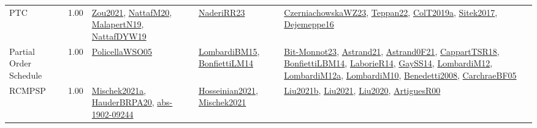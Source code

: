 {\begin{longtable}{p{3cm}r>{\raggedright\arraybackslash}p{6cm}>{\raggedright\arraybackslash}p{6cm}>{\raggedright\arraybackslash}p{8cm}}
\index{PTC}\index{Classification!PTC}PTC &  1.00 & \hyperref[detail:Zou2021]{Zou2021}, \hyperref[detail:NattafM20]{NattafM20}, \hyperref[detail:MalapertN19]{MalapertN19}, \hyperref[detail:NattafDYW19]{NattafDYW19} & \hyperref[detail:NaderiRR23]{NaderiRR23} & \hyperref[detail:CzerniachowskaWZ23]{CzerniachowskaWZ23}, \hyperref[detail:Teppan22]{Teppan22}, \hyperref[detail:ColT2019a]{ColT2019a}, \hyperref[detail:Sitek2017]{Sitek2017}, \hyperref[detail:Dejemeppe16]{Dejemeppe16}\\
\index{Partial Order Schedule}\index{Classification!Partial Order Schedule}Partial Order Schedule &  1.00 & \hyperref[detail:PolicellaWSO05]{PolicellaWSO05} & \hyperref[detail:LombardiBM15]{LombardiBM15}, \hyperref[detail:BonfiettiLM14]{BonfiettiLM14} & \hyperref[detail:Bit-Monnot23]{Bit-Monnot23}, \hyperref[detail:Astrand21]{Astrand21}, \hyperref[detail:Astrand0F21]{Astrand0F21}, \hyperref[detail:CappartTSR18]{CappartTSR18}, \hyperref[detail:BonfiettiLBM14]{BonfiettiLBM14}, \hyperref[detail:LaborieR14]{LaborieR14}, \hyperref[detail:GaySS14]{GaySS14}, \hyperref[detail:LombardiM12]{LombardiM12}, \hyperref[detail:LombardiM12a]{LombardiM12a}, \hyperref[detail:LombardiM10]{LombardiM10}, \hyperref[detail:Benedetti2008]{Benedetti2008}, \hyperref[detail:CarchraeBF05]{CarchraeBF05}\\
\index{RCMPSP}\index{Classification!RCMPSP}RCMPSP &  1.00 & \hyperref[detail:Mischek2021a]{Mischek2021a}, \hyperref[detail:HauderBRPA20]{HauderBRPA20}, \hyperref[detail:abs-1902-09244]{abs-1902-09244} & \hyperref[detail:Hosseinian2021]{Hosseinian2021}, \hyperref[detail:Mischek2021]{Mischek2021} & \hyperref[detail:Liu2021b]{Liu2021b}, \hyperref[detail:Liu2021]{Liu2021}, \hyperref[detail:Liu2020]{Liu2020}, \hyperref[detail:ArtiguesR00]{ArtiguesR00}\\

\end{longtable}}
